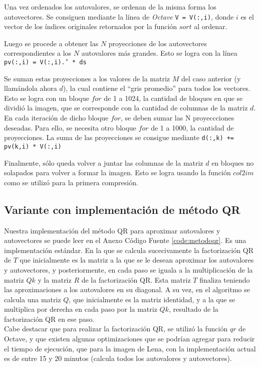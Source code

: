 \documentclass[twocolumn,a4paper,10pt]{article}
\begin{document}
Una vez ordenados los autovalores, se ordenan de la misma forma los autovectores. Se consiguen mediante la línea de \textit{Octave} \texttt{V = V(:,i)}, 
donde $i$ es el vector de los índices originales retornados por la función $sort$ al ordenar.

Luego se procede a obtener las $N$ proyecciones de los autovectores correspondientes a los $N$ autovalores más grandes. Esto se logra con la línea 
\texttt{pv(:,i) = V(:,i).' * ds}

Se suman estas proyecciones a los valores de la matriz $M$ del caso anterior (y llam\'andola ahora $d$), la cual contiene el ``gris promedio'' para todos 
los vectores. Esto se logra con un bloque $for$ de 1 a 1024, la cantidad de bloques en que se dividió la imagen, que se corresponde con la cantidad de 
columnas de la matriz $d$. En cada iteración de dicho bloque $for$, se deben sumar las N proyeccciones deseadas. Para ello, se necesita otro bloque $for$
 de 1 a 1000, la cantidad de proyecciones. La suma de las proyecciones se consigue mediante \texttt{d(:,k)\: += pv(k,i) * V(:,i)}

Finalmente, s\'olo queda volver a juntar las columnas de la matriz $d$ en bloques no solapados para volver a formar la imagen. Esto se logra usando 
la funci\'on $col2im$ como se utilizó para la primera compresi\'on. \\

\subsection{Variante con implementaci\'on de m\'etodo QR}

Nuestra implementaci\'on del m\'etodo QR para aproximar autovalores y autovectores se puede leer en el Anexo C\'odigo Fuente \ref{code:metodoqr}. Es una 
implementaci\'on est\'andar\cite{Wikipedia_QR}. En la que se calcula sucecivamente la factorizaci\'on QR de $T$ que inicialmente es la matriz a la que se le desean aproximar los 
autovalores y autovectores, y posteriormente, en cada paso se iguala a la multiplicaci\'on de la matriz $Qk$ y la matriz $R$ de la factorizaci\'on QR. 
Esta matriz $T$ finaliza teniendo las aproximaciones a los autovalores en su diagonal. A su vez, en el algoritmo se calcula una matriz $Q$, que inicialmente es la 
matriz identidad, y a la que se multiplica por derecha en cada paso por la matriz $Qk$, resultado de la factorizaci\'on QR en ese paso.\\

Cabe destacar que para realizar la factorizaci\'on QR, se utiliz\'o la funci\'on $qr$ de Octave, y que existen algunas optimizaciones que se podr\'ian agregar para 
reducir el tiempo de ejecuci\'on, que para la imagen de Lena, con la implementaci\'on actual es de entre 15 y 20 minutos (calcula todos los autovalores y autovectores).\\
\end{document}

